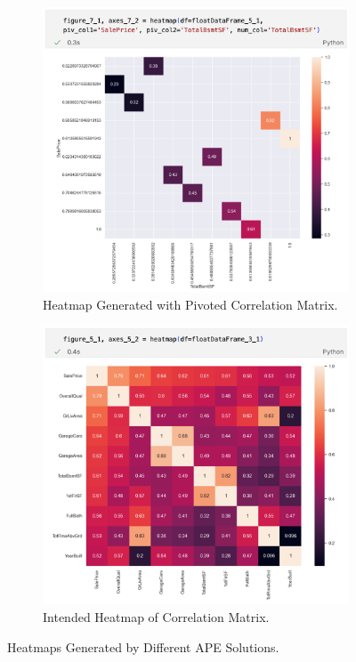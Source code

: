 \begin{figure}[h]
    \centering
    \begin{subfigure}[t]{.47\textwidth}
        \centering
        \includegraphics[width=\textwidth]{Tex//images//native_ape_eval//heatmap_error.png}
        \caption{Heatmap Generated with Pivoted Correlation Matrix.}
        \label{fig:native_ape_heatmap_error}
    \end{subfigure}%
    \hfill
    \begin{subfigure}[t]{.47\textwidth}
        \centering
        \includegraphics[width=\textwidth]{Tex//images//native_ape_eval//heatmap_intended.png}
        \caption{Intended Heatmap of Correlation Matrix.}
        \label{fig:native_ape_heatmap_intended}
    \end{subfigure}
    \caption{Heatmaps Generated by Different APE Solutions.}
    \label{fig:native_ape_double_heatmap}
\end{figure}

